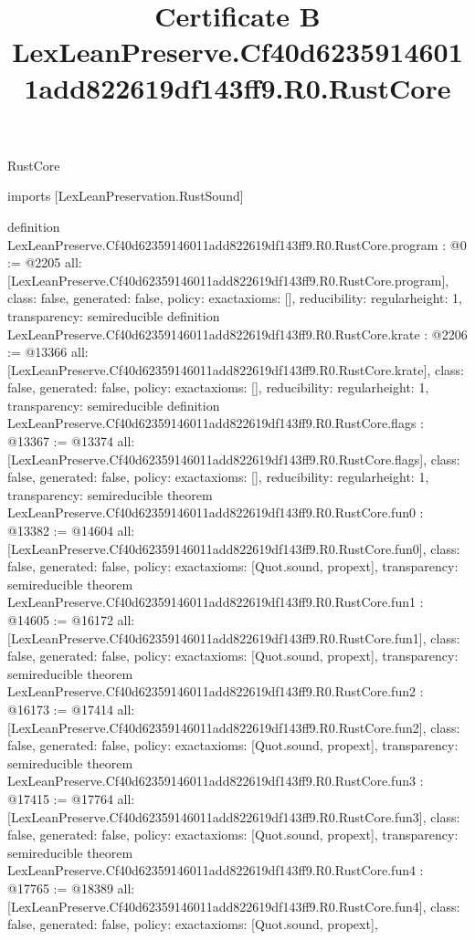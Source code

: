 \begin{lexlean}{RustCore}
\title{Certificate B LexLeanPreserve.Cf40d62359146011add822619df143ff9.R0.RustCore}
\begin{coremodule}
imports [LexLeanPreservation.RustSound]

definition LexLeanPreserve.Cf40d62359146011add822619df143ff9.R0.RustCore.program : @0 := @2205 {
  all: [LexLeanPreserve.Cf40d62359146011add822619df143ff9.R0.RustCore.program],
  class: false,
  generated: false,
  policy: exact{axioms: []},
  reducibility: regular{height: 1},
  transparency: semireducible
}
definition LexLeanPreserve.Cf40d62359146011add822619df143ff9.R0.RustCore.krate : @2206 := @13366 {
  all: [LexLeanPreserve.Cf40d62359146011add822619df143ff9.R0.RustCore.krate],
  class: false,
  generated: false,
  policy: exact{axioms: []},
  reducibility: regular{height: 1},
  transparency: semireducible
}
definition LexLeanPreserve.Cf40d62359146011add822619df143ff9.R0.RustCore.flags : @13367 := @13374 {
  all: [LexLeanPreserve.Cf40d62359146011add822619df143ff9.R0.RustCore.flags],
  class: false,
  generated: false,
  policy: exact{axioms: []},
  reducibility: regular{height: 1},
  transparency: semireducible
}
theorem LexLeanPreserve.Cf40d62359146011add822619df143ff9.R0.RustCore.fun0 : @13382 := @14604 {
  all: [LexLeanPreserve.Cf40d62359146011add822619df143ff9.R0.RustCore.fun0],
  class: false,
  generated: false,
  policy: exact{axioms: [Quot.sound, propext]},
  transparency: semireducible
}
theorem LexLeanPreserve.Cf40d62359146011add822619df143ff9.R0.RustCore.fun1 : @14605 := @16172 {
  all: [LexLeanPreserve.Cf40d62359146011add822619df143ff9.R0.RustCore.fun1],
  class: false,
  generated: false,
  policy: exact{axioms: [Quot.sound, propext]},
  transparency: semireducible
}
theorem LexLeanPreserve.Cf40d62359146011add822619df143ff9.R0.RustCore.fun2 : @16173 := @17414 {
  all: [LexLeanPreserve.Cf40d62359146011add822619df143ff9.R0.RustCore.fun2],
  class: false,
  generated: false,
  policy: exact{axioms: [Quot.sound, propext]},
  transparency: semireducible
}
theorem LexLeanPreserve.Cf40d62359146011add822619df143ff9.R0.RustCore.fun3 : @17415 := @17764 {
  all: [LexLeanPreserve.Cf40d62359146011add822619df143ff9.R0.RustCore.fun3],
  class: false,
  generated: false,
  policy: exact{axioms: [Quot.sound, propext]},
  transparency: semireducible
}
theorem LexLeanPreserve.Cf40d62359146011add822619df143ff9.R0.RustCore.fun4 : @17765 := @18389 {
  all: [LexLeanPreserve.Cf40d62359146011add822619df143ff9.R0.RustCore.fun4],
  class: false,
  generated: false,
  policy: exact{axioms: [Quot.sound, propext]},
}
\end{coremodule}
\end{lexlean}
